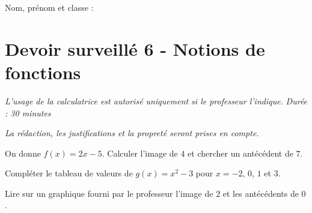 \documentclass[a4paper,10pt]{report}
\begin{document}
\pagestyle{empty}
\noindent Nom, prénom et classe : \dotfill

\section*{Devoir surveillé 6 - Notions de fonctions}

\noindent \textit{L'usage de la calculatrice est autorisé uniquement si le professeur l'indique.} \hfill \textit{Durée : 30 minutes}

\medskip
\noindent \textit{La rédaction, les justifications et la propreté seront prises en compte.}


\begin{ex}
On donne $f(x)=2x-5$. Calculer l'image de $4$ et chercher un antécédent de $7$.
\medskip\noindent\grandscarreaux{\linewidth}{4cm}
\end{ex}
\begin{ex}[Tableau]
Compléter le tableau de valeurs de $g(x)=x^2-3$ pour $x=-2$, $0$, $1$ et $3$.
\medskip\noindent\grandscarreaux{\linewidth}{4cm}
\end{ex}
\begin{ex}[Graphique]
Lire sur un graphique fourni par le professeur l'image de $2$ et les antécédents de $0$.
\medskip\noindent\grandscarreaux{\linewidth}{4cm}
\end{ex}
\end{document}
